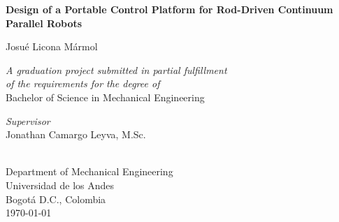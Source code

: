 \begin{titlepage}
    \begin{spacing}{1}
    \hypertarget{titlepage}{} %
    \begin{center}
        \vspace*{0.5cm}

        \LARGE
        \textbf{Design of a Portable Control Platform for Rod-Driven Continuum Parallel Robots}

        \vspace{2cm}
        \Large
        Josué Licona Mármol

        \large
        \vspace{1.5cm}
        \textit{A graduation project submitted in partial fulfillment \\
        of the requirements for the degree of} \\
        \vspace{0.5cm}
        Bachelor of Science in Mechanical Engineering

        \vspace{1.5cm}
        \textit{Supervisor} \\
        Jonathan Camargo Leyva, M.Sc.

        \vspace{1cm}
        \vspace{1cm}
        \\
        Department of Mechanical Engineering\\
        Universidad de los Andes\\
        Bogotá D.C., Colombia\\
        \today
    \end{center}
    \end{spacing}
\end{titlepage}
\setcounter{page}{2}
\normalsize